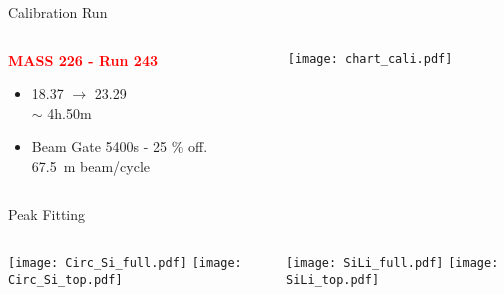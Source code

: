 \documentclass[10pt]{beamer}
\title{\normalsize }
\institute{}
\author{}
\date{}
\begin{document}
\frame{\titlepage}

\begin{frame}{Calibration Run}
	
	
	\begin{columns}
		\begin{column}{0.5\textwidth}
			\begin{overlayarea}{\textwidth}{0.5\textheight}
				\centering
				\textcolor{red}{\textbf{MASS 226 - Run 243}}
				\begin{itemize}
					\item 18.37 $\rightarrow$ 23.29 \\ $\sim$ 4h.50m
					\item Beam Gate 5400s - 25 \% off. \\ 67.5~m beam/cycle
				\end{itemize}
			\end{overlayarea}
		\end{column}
		\begin{column}{0.5\textwidth}
			\begin{overlayarea}{\textwidth}{0.5\textheight}
				\centering
				\vspace{-0.05\textheight}
				\texttt{[image: chart\_cali.pdf]}
			\end{overlayarea}
		\end{column}
	\end{columns}	



\end{frame}

\begin{frame}{Peak Fitting}
	
	\vspace{-0.1\textheight}
	\begin{columns}
		\begin{column}{0.5\textwidth}
			\begin{overlayarea}{\textwidth}{0.5\textheight}
				\centering
				\vspace{-0.05\textheight}
				\texttt{[image: Circ\_Si\_full.pdf]}
				\texttt{[image: Circ\_Si\_top.pdf]}
			\end{overlayarea}
		\end{column}
		\begin{column}{0.5\textwidth}
			\begin{overlayarea}{\textwidth}{0.5\textheight}
				\centering
				\vspace{-0.05\textheight}
				\texttt{[image: SiLi\_full.pdf]}
				\texttt{[image: SiLi\_top.pdf]}
			\end{overlayarea}
		\end{column}
	\end{columns}	



\end{frame}
\end{document}
